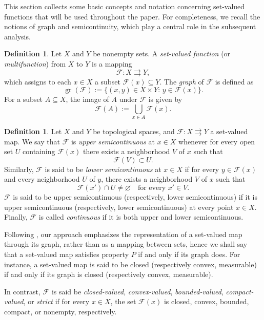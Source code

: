 \documentclass[11pt]{elsarticle}
\theoremstyle{definition}
\newtheorem{definition}[theorem]{Definition}
\theoremstyle{remark}
\numberwithin{equation}{section}
\def\gr{\operatorname{gr}}
\begin{document}
	This section collects some basic concepts and notation concerning set-valued functions that will be used throughout the paper. For completeness, we recall the notions of graph and semicontinuity, which play a central role in the subsequent analysis.
	
	\begin{definition}
		Let $X$ and $Y$ be nonempty sets. A \emph{set-valued function} (or \emph{multifunction}) from $X$ to $Y$ is a mapping
		\[
		\mathcal{F}:X \rightrightarrows Y,
		\]
		which assigns to each $x\in X$ a subset $\mathcal{F}(x)\subseteq Y$. The \emph{graph} of $\mathcal{F}$ is defined as
		\[
		\gr(\mathcal{F}):=\{(x,y)\in X\times Y:\, y\in \mathcal{F}(x)\}.
		\]
		For a subset $A\subseteq X$, the image of $A$ under $\mathcal{F}$ is given by
		\[
		\mathcal{F}(A):=\bigcup_{x\in A}\mathcal{F}(x).
		\]
	\end{definition}
	
	
	\begin{definition}
		Let $X$ and $Y$ be topological spaces, and
		$\mathcal{F}:X\rightrightarrows Y$ a set-valued map.
		We say that $\mathcal{F}$ is \emph{upper semicontinuous} at $x\in X$ whenever for every open set
		$U$ containing $\mathcal{F}(x)$ there exists a neighborhood $V$ of $x$ such that
		\[
		\mathcal{F}(V)\subset U.
		\]
		Similarly, $\mathcal{F}$ is said to be \emph{lower semicontinuous} at $x\in X$
		if for every $y\in \mathcal{F}(x)$ and every neighborhood $U$ of $y$, there exists a neighborhood $V$ of $x$ such that
		\[
		\mathcal{F}(x') \cap U \neq \varnothing \quad \text{for every } x' \in V.
		\] 
		$\mathcal{F}$ is said to be upper semicontinuous (respectively, lower semicontinuous) if it is upper semicontinuous (respectively, lower semicontinuous) at every point $x\in X$. 
		Finally, $\mathcal{F}$ is called \emph{continuous} if it is both upper and
		lower semicontinuous.
	\end{definition}
	
	
	Following \cite{aubin_frankowska_2009}, our approach emphasizes the representation of a set-valued map through its graph, rather than as a mapping between sets, hence we shall say that a set-valued map satisfies property $P$ if and only if its graph does.
	For instance, a set-valued map is said to be closed (respectively convex, measurable) if and only if its graph is closed (respectively convex, measurable).
	
	
	
	In contrast, $\mathcal{F}$ is said be \emph{closed-valued}, \emph{convex-valued}, \emph{bounded-valued}, \emph{compact-valued}, or \emph{strict} if for every $x\in X$, the set \(\mathcal{F}(x)\) is closed, convex, bounded, compact, or nonempty, respectively.
	
\end{document}
